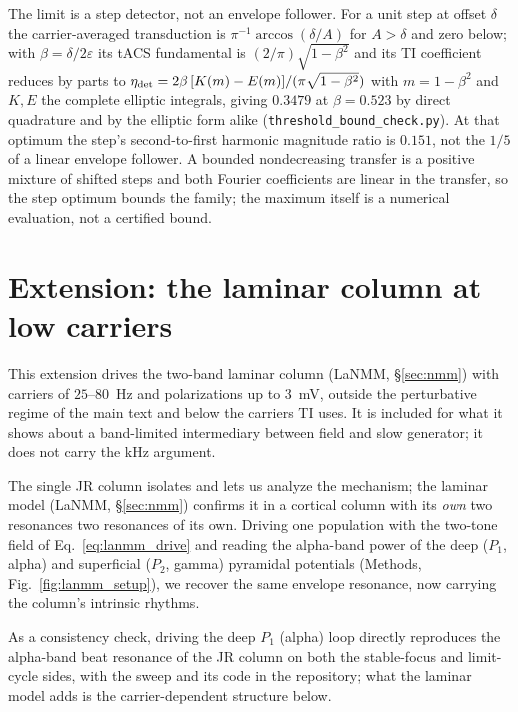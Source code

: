 \documentclass[11pt,a4paper]{article}
\providecommand{\DIFaddtex}[1]{{\protect\color{blue} \sf #1}} %
\providecommand{\DIFdeltex}[1]{{\protect\color{red} \scriptsize #1}} %
\providecommand{\DIFaddbegin}{} %
\providecommand{\DIFaddend}{} %
\providecommand{\DIFdelbegin}{} %
\providecommand{\DIFdelend}{} %
\providecommand{\DIFadd}[1]{\texorpdfstring{\DIFaddtex{#1}}{#1}} %
\providecommand{\DIFdel}[1]{\texorpdfstring{\DIFdeltex{#1}}{}} %
\begin{document}
The limit is a step detector, not an envelope follower. For a unit step at offset
$\delta$ the carrier-averaged transduction is $\pi^{-1}\arccos(\delta/A)$ for $A>\delta$
and zero below; with $\beta=\delta/2\varepsilon$ its tACS fundamental is
$(2/\pi)\sqrt{1-\beta^2}$ and its TI coefficient reduces by parts to
$\eta_{\rm det}=2\beta\,[K(m)-E(m)]/(\pi\sqrt{1-\beta^2})$ with $m=1-\beta^2$ and $K,E$
the complete elliptic integrals, giving $0.3479$ at $\beta=0.523$ by direct quadrature and
by the elliptic form alike (\texttt{threshold\_bound\_check.py}). At that optimum the
step's second-to-first harmonic magnitude ratio is $0.151$, not the $1/5$ of a linear
envelope follower. A bounded nondecreasing transfer is a positive mixture of shifted steps
and both Fourier coefficients are linear in the transfer, so the step optimum bounds the
family; the maximum itself is a numerical evaluation, not a certified bound.

\section{Extension: the laminar column at low carriers}\label{app:lanmm}
\label{sec:lanmm-results}
This extension drives the two-band laminar column (LaNMM, \S\ref{sec:nmm}) with carriers
of $25$--$80$~Hz and polarizations up to $3$~mV, outside the perturbative regime of the
main text and below the carriers TI uses. It is included for what it shows about a
band-limited intermediary between field and slow generator; it does not carry the kHz
argument.

The single JR column isolates \DIFdelbegin \DIFdel{and lets us analyze }\DIFdelend the mechanism; the laminar model
(LaNMM, \S\ref{sec:nmm}) confirms it in a cortical column with \DIFdelbegin \DIFdel{its \emph{own} two resonances }\DIFdelend \DIFaddbegin \DIFadd{two resonances of its
own}\DIFaddend . Driving one population with the two-tone field of Eq.~\eqref{eq:lanmm_drive}
and reading the alpha-band power of the deep ($P_1$, alpha) and superficial ($P_2$,
gamma) pyramidal potentials (Methods, Fig.~\ref{fig:lanmm_setup}), we recover the
same envelope resonance, now carrying the column's intrinsic rhythms.

As a consistency check, driving the deep $P_1$ (alpha) loop directly reproduces the
alpha-band beat resonance of the JR column on both the stable-focus and limit-cycle sides,
with the sweep and its code in the repository; what the laminar model adds is the
carrier-dependent structure below.
\end{document}
